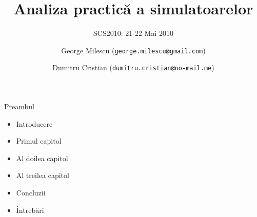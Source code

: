 \documentclass{beamer}
\title{Analiza practică a simulatoarelor}
\subtitle{SCS2010: 21-22 Mai 2010}
\institute{Prof. Dr. Ing. Nume Prenume}
\author{George Milescu (\texttt{george.milescu@gmail.com}) \and
  Dumitru Cristian (\texttt{dumitru.cristian@no-mail.me})}
\begin{document}
{
  \frame{\titlepage}
}

\begin{frame}{Preambul}
  \begin{itemize}
    \item Introducere
    \item Primul capitol
    \item Al doilea capitol
    \item Al treilea capitol
    \item Concluzii
    \item Întrebări
  \end{itemize}
\end{frame}
\end{document}

